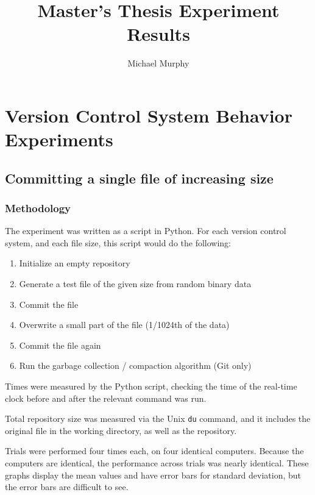 \documentclass[a4paper]{article}
\begin{document}
\title{Master's Thesis Experiment Results}
\author{Michael Murphy}
\maketitle

\section{Version Control System Behavior Experiments}

\subsection{Committing a single file of increasing size}

\iffalse

\subsubsection{Methodology}

The experiment was written as a script in Python. For each version control
system, and each file size, this script would do the following:

\begin{enumerate}
    \setlength{\itemsep}{0pt}
    \setlength{\parskip}{0pt}
    \setlength{\parsep}{0pt}
    \item Initialize an empty repository
    \item Generate a test file of the given size from random binary data
    \item Commit the file
    \item Overwrite a small part of the file (1/1024th of the data)
    \item Commit the file again
    \item Run the garbage collection / compaction algorithm (Git only)
\end{enumerate}

Times were measured by the Python script, checking the time of the real-time
clock before and after the relevant command was run.

Total repository size was measured via the Unix \lstinline{du} command, and it
includes the original file in the working directory, as well as the repository.

Trials were performed four times each, on four identical computers. Because the
computers are identical, the performance across trials was nearly identical.
These graphs display the mean values and have error bars for standard deviation,
but the error bars are difficult to see.
\end{document}
